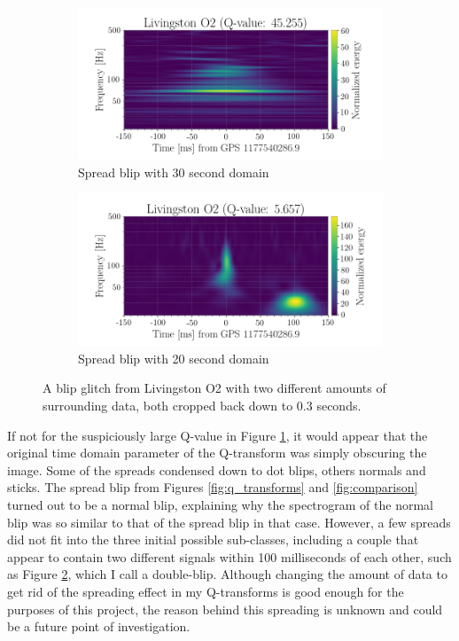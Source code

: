 \documentclass[a4paper]{article}
\begin{document}
\begin{figure}[h!]
	\centering
	\begin{subfigure}{.49\textwidth}
		\centering
		\includegraphics[width=1\linewidth]{spread_ex_30s}
		\caption{Spread blip with 30 second domain}
		\label{fig:spread_30}
	\end{subfigure}
	\begin{subfigure}{.49\textwidth}
		\centering
		\includegraphics[width=1\linewidth]{spread_ex_20s}
		\caption{Spread blip with 20 second domain}
		\label{fig:spread_20}
	\end{subfigure}
	\caption{A blip glitch from Livingston O2 with two different amounts of surrounding data, both cropped back down to 0.3 seconds.}%
	\label{fig:spread_ex}
\end{figure}

If not for the suspiciously large Q-value in Figure \ref{fig:spread_30}, it would appear that the original time domain parameter of the Q-transform was simply obscuring the image. Some of the spreads condensed down to dot blips, others normals and sticks. The spread blip from Figures \ref{fig:q_transforms} and \ref{fig:comparison} turned out to be a normal blip, explaining why the spectrogram of the normal blip was so similar to that of the spread blip in that case. However, a few spreads did not fit into the three initial possible sub-classes, including a couple that appear to contain two different signals within 100 milliseconds of each other, such as Figure \ref{fig:spread_20}, which I call a double-blip. Although changing the amount of data to get rid of the spreading effect in my Q-transforms is good enough for the purposes of this project, the reason behind this spreading is unknown and could be a future point of investigation.
\end{document}
